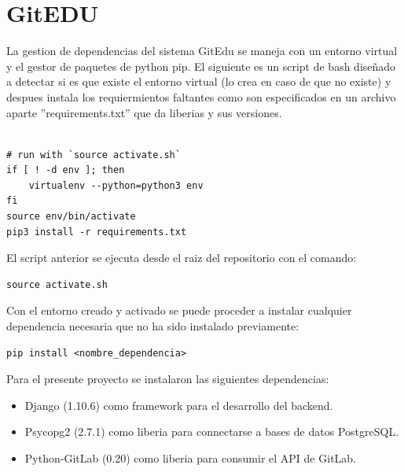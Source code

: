 

\section{GitEDU}

La gestion de dependencias del sistema GitEdu se maneja con un entorno virtual y el gestor de paquetes de python pip. El siguiente es un script de bash diseñado a detectar si es que existe el entorno virtual (lo crea en caso de que no existe) y despues instala los requiermientos faltantes como son especificados en un archivo aparte ''requirements.txt'' que da liberias y sus versiones.

\begin{lstlisting}

# run with `source activate.sh` 
if [ ! -d env ]; then
	virtualenv --python=python3 env
fi
source env/bin/activate
pip3 install -r requirements.txt

\end{lstlisting}

El script anterior se ejecuta desde el raiz del repositorio con el comando:

\begin{lstlisting}
source activate.sh
\end{lstlisting}

Con el entorno creado y activado se puede proceder a instalar cualquier dependencia necesaria que no ha sido instalado previamente:

\begin{lstlisting}
pip install <nombre_dependencia>
\end{lstlisting}

Para el presente proyecto se instalaron las siguientes dependencias:
\begin{itemize}
	\item Django (1.10.6) como framework para el desarrollo del backend.
    \item Psycopg2 (2.7.1) como liberia para connectarse a bases de datos PostgreSQL.
    \item Python-GitLab (0.20) como liberia para consumir el API de GitLab.
\end{itemize}

